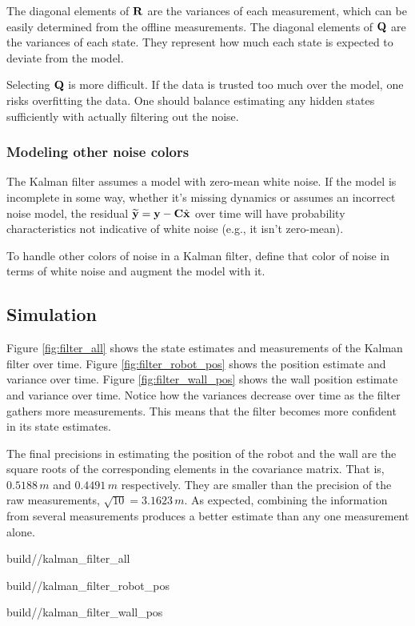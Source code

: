 The diagonal elements of $\mathbf{R}$ are the variances of each measurement, which
can be easily determined from the offline measurements. The diagonal elements of
$\mathbf{Q}$ are the variances of each \gls{state}. They represent how much each
\gls{state} is expected to deviate from the \gls{model}.

Selecting $\mathbf{Q}$ is more difficult. If the data is trusted too much over the
model, one risks overfitting the data. One should balance estimating any hidden
\glspl{state} sufficiently with actually filtering out the noise.

\subsubsection{Modeling other noise colors}

The Kalman filter assumes a \gls{model} with zero-mean white noise. If the
\gls{model} is incomplete in some way, whether it's missing dynamics or assumes
an incorrect noise \gls{model}, the residual
$\widetilde{\mathbf{y}} = \mathbf{y} - \mathbf{C}\hat{\mathbf{x}}$ over time will have
probability characteristics not indicative of white noise (e.g., it isn't
zero-mean).

To handle other colors of noise in a Kalman filter, define that color of noise
in terms of white noise and augment the \gls{model} with it.

\subsection{Simulation}
\label{subsec:filter_simulation}

Figure \ref{fig:filter_all} shows the \gls{state} estimates and measurements of
the Kalman filter over time. Figure \ref{fig:filter_robot_pos} shows the
position estimate and variance over time. Figure \ref{fig:filter_wall_pos} shows
the wall position estimate and variance over time. Notice how the variances
decrease over time as the filter gathers more measurements. This means that the
filter becomes more confident in its \gls{state} estimates.

The final precisions in estimating the position of the robot and the wall are
the square roots of the corresponding elements in the covariance matrix. That
is, $0.5188\,m$ and $0.4491\,m$ respectively. They are smaller than the
precision of the raw measurements, $\sqrt{10} = 3.1623\,m$. As expected,
combining the information from several measurements produces a better estimate
than any one measurement alone.
\begin{svg}{build/\chapterpath/kalman_filter_all}
  \caption{State estimates and measurements with Kalman filter}
  \label{fig:filter_all}
\end{svg}
\begin{svg}{build/\chapterpath/kalman_filter_robot_pos}
  \caption{Robot position estimate and variance with Kalman filter}
  \label{fig:filter_robot_pos}
\end{svg}
\begin{svg}{build/\chapterpath/kalman_filter_wall_pos}
  \caption{Wall position estimate and variance with Kalman filter}
  \label{fig:filter_wall_pos}
\end{svg}

